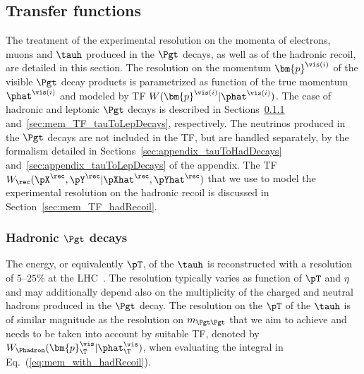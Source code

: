 \subsection{Transfer functions}
\label{sec:mem_TF}

The treatment of the experimental resolution on the momenta of electrons, muons and $\tauh$ produced in the $\Pgt$ decays,
as well as of the hadronic recoil, are detailed in this section.
The resolution on the momentum $\bm{p}^{\vis(i)}$ of the visible $\Pgt$ decay products is parametrized as function of the true momentum $\phat^{\vis(i)}$
and modeled by TF $W(\bm{p}^{\vis(i)}|\phat^{\vis(i)})$.
The case of hadronic and leptonic $\Pgt$ decays is described in
Sections~\ref{sec:mem_TF_tauToHadDecays}
and~\ref{sec:mem_TF_tauToLepDecays}, respectively.
The neutrinos produced in the $\Pgt$ decays are not
included in the TF, but are handled separately, by the formalism detailed in Sections~\ref{sec:appendix_tauToHadDecays} and~\ref{sec:appendix_tauToLepDecays} of the appendix.
The TF $W_{\rec}( \pX^{\rec},\pY^{\rec} | \pXhat^{\rec},\pYhat^{\rec} )$ that we use to model the experimental resolution on the
hadronic recoil is discussed in Section~\ref{sec:mem_TF_hadRecoil}.


\subsubsection{Hadronic $\Pgt$ decays}
\label{sec:mem_TF_tauToHadDecays}

The energy, or equivalently $\pT$, of the $\tauh$ 
is reconstructed with a
resolution of $5$--$25\%$ at the
LHC~\cite{Aad:2014rga,TAU-14-001}.
The resolution typically varies as function of $\pT$ and $\eta$ and may additionally depend
also on the multiplicity of the charged and neutral hadrons produced in the $\Pgt$ decay.
The resolution on the $\pT$ of the $\tauh$ is of similar magnitude as the
resolution on $m_{\Pgt\Pgt}$ that we aim to achieve and needs to be
taken into account by suitable TF,
denoted by $W_{\Phadron}( \bm{p}_{\T}^{\vis} | \phat_{\T}^{\vis} )$,
when evaluating the integral in Eq.~(\ref{eq:mem_with_hadRecoil}).

